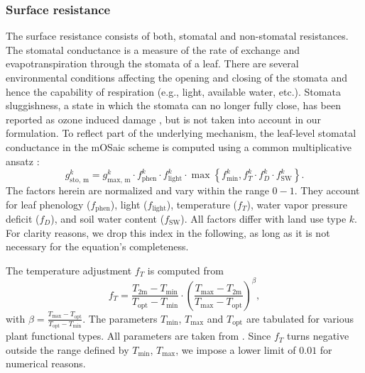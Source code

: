 \documentclass[gmd, manuscript]{copernicus}
\begin{document}
\subsubsection{Surface resistance}
\label{subsubsec:Rc}
The surface resistance consists of both, stomatal and non-stomatal resistances.\\ 
The stomatal conductance is a measure of the rate of  exchange and evapotranspiration through the stomata of a leaf. There are several environmental conditions affecting the opening and closing of the stomata and hence the capability of respiration (e.g., light, available water, etc.). Stomata sluggishness, a state in which the stomata can no longer fully close, has been reported as ozone induced damage \citep{SR:Hoshika2015}, but is not taken into account in our formulation. To reflect part of the underlying mechanism, the leaf-level stomatal conductance in the mOSaic scheme is computed using a common multiplicative ansatz \citep{BallBerry1987, ICP:MappingManual2017}:
%
\begin{equation}
  g^k_\text{sto, m} = g^k_\text{max, m} \cdot f^k_\text{phen} \cdot f^k_\text{light} \cdot \max{\left\{f^k_\text{min}, f^k_T \cdot f^k_D \cdot f^k_\text{SW}\right\}}.
  \label{eq:stomatal}
\end{equation}
%
The factors herein are normalized and vary within the range $0-1$. They account for leaf phenology ($f_\text{phen}$), light ($f_\text{light}$), temperature ($f_T$), water vapor pressure deficit ($f_D$), and soil water content ($f_\text{SW}$). All factors differ with land use type $k$. For clarity reasons, we drop this index in the following, as long as it is not necessary for the equation's completeness.

The temperature adjustment $f_T$ is computed from
%
\begin{equation}
  f_T = \frac{T_\text{2m}-T_\text{min}}{T_\text{opt}-T_\text{min}} \cdot \left(\frac{T_{\text{max}}-T_\text{2m}}{T_{\text{max}}-T_\text{opt}}\right)^\beta, 
\end{equation}
with $\beta = \frac{T_\text{max}-T_\text{opt}}{T_\text{opt}-T_\text{min}}$. The parameters $T_\text{min}$, $T_\text{max}$ and $T_\text{opt}$ are tabulated for various plant functional types. All parameters are taken from \citet[][Tables S16, S19]{ACP:Simpson2012}. Since $f_T$ turns negative outside the range defined by $T_\text{min}$, $T_\text{max}$, we impose a lower limit of $0.01$ for numerical reasons.
\end{document}
